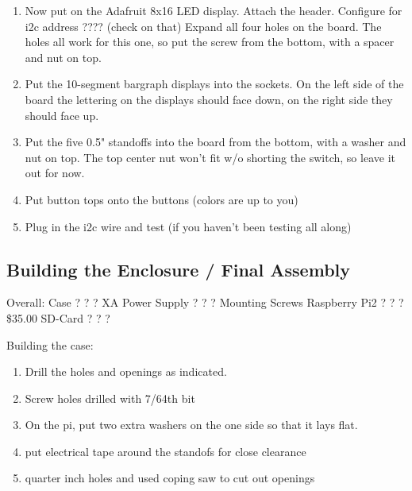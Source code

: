 \documentclass[11pt]{article}
\begin{document}
\begin{enumerate}
\item	Now put on the Adafruit 8x16 LED display.  Attach the header.
	Configure for i2c address ???? (check on that)
	Expand all four holes on the board.
	The holes all work for this one, so put the screw from the bottom,
	with a spacer and nut on top.

\item	Put the 10-segment bargraph displays into the sockets.
	On the left side of the board the lettering on the displays should
	face down, on the right side they should face up.

\item	Put the five 0.5" standoffs into the board from the bottom, with
	a washer and nut on top.  The top center nut won't fit w/o shorting
	the switch, so leave it out for now.

\item	Put button tops onto the buttons (colors are up to you)

\item	Plug in the i2c wire and test (if you haven't been testing all along)
\end{enumerate}


\subsection{Building the Enclosure / Final Assembly}

Overall:
	Case		?		?		?
	XA Power Supply	?		?		?
	Mounting Screws
	Raspberry Pi2	?		?		?	\$35.00
	SD-Card		?		?		?




Building the case:
\begin{enumerate}
\item	Drill the holes and openings as indicated.

\item	Screw holes drilled with 7/64th bit

\item	On the pi, put two extra washers on the one side so that it lays
	flat.

\item	put electrical tape around the standofs for close clearance
	
\item	quarter inch holes and used coping saw to cut out openings
\end{enumerate}
\end{document}
